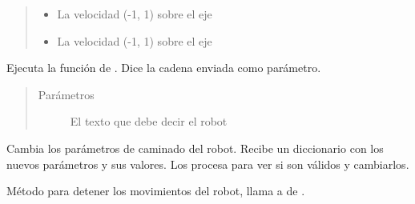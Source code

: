 \begin{fulllineitems}
\begin{fulllineitems}
\begin{quote}
\begin{description}
\begin{itemize}
\item {} 
 \textendash{} La velocidad (-1, 1) sobre el eje 

\item {} 
 \textendash{} La velocidad (-1, 1) sobre el eje 

\end{itemize}

\end{description}\end{quote}

\end{fulllineitems}


\begin{fulllineitems}
\label{\detokenize{nao_firebase:nao_robot.Robot.say_speech}}
Ejecuta la función  de . Dice la cadena
enviada como parámetro.
\begin{quote}\begin{description}
\item[{Parámetros}] \leavevmode
{} \textendash{} El texto que debe decir el robot

\end{description}\end{quote}

\end{fulllineitems}


\begin{fulllineitems}
\label{\detokenize{nao_firebase:nao_robot.Robot.set_move_config}}
Cambia los parámetros de caminado del robot. Recibe un diccionario
con los nuevos parámetros y sus valores. Los procesa para ver si son válidos
y cambiarlos.

\end{fulllineitems}


\begin{fulllineitems}
\label{\detokenize{nao_firebase:nao_robot.Robot.stop_movement}}
Método para detener los movimientos del robot, llama a 
de .


\end{fulllineitems}
\end{fulllineitems}
